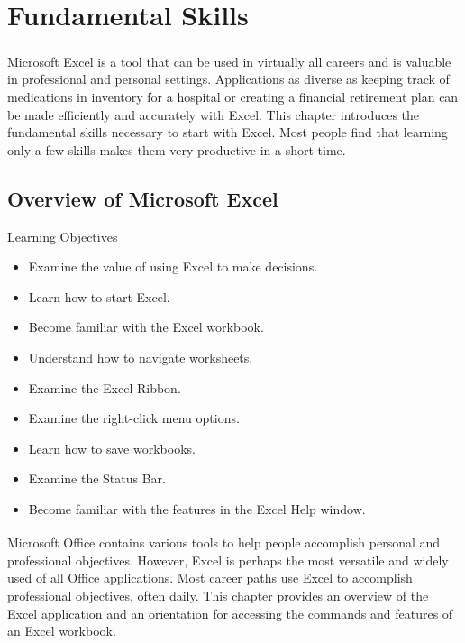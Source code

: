 \chapter{Fundamental Skills}\label{ch01:fundamentals}

Microsoft\textsuperscript{\textregistered} Excel\textsuperscript{\textregistered} is a tool that can be used in virtually all careers and is valuable in professional and personal settings. Applications as diverse as keeping track of medications in inventory for a hospital or creating a financial retirement plan can be made efficiently and accurately with Excel. This chapter introduces the fundamental skills necessary to start with Excel. Most people find that learning only a few skills makes them very productive in a short time. 

\section{Overview of Microsoft Excel}

\begin{center}
	\begin{objbox}{Learning Objectives}
		\begin{itemize}
			\setlength{\itemsep}{0pt}
			\setlength{\parskip}{0pt}
			\setlength{\parsep}{0pt}
			
			\item Examine the value of using Excel to make decisions.
			\item Learn how to start Excel.
			\item Become familiar with the Excel workbook.
			\item Understand how to navigate worksheets.
			\item Examine the Excel Ribbon.
			\item Examine the right-click menu options.
			\item Learn how to save workbooks.
			\item Examine the Status Bar.
			\item Become familiar with the features in the Excel Help window.
			
		\end{itemize}
	\end{objbox}
\end{center}

Microsoft\textsuperscript{\textregistered} Office\textsuperscript{\textregistered} contains various tools to help people accomplish personal and professional objectives. However, Excel is perhaps the most versatile and widely used of all Office applications. Most career paths use Excel to accomplish professional objectives, often daily. This chapter provides an overview of the Excel application and an orientation for accessing the commands and features of an Excel workbook.

